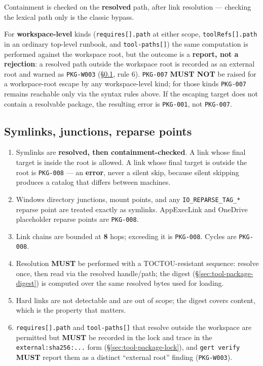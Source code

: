 Containment is checked on the \textbf{resolved} path, after link
resolution --- checking the lexical path only is the classic bypass.

For \textbf{workspace-level} kinds (\texttt{requires[].path} at either
scope, \texttt{toolRefs[].path} in an ordinary top-level runbook, and
\texttt{tool-paths[]}) the same computation is performed against the
workspace root, but the outcome is a \textbf{report, not a rejection}: a
resolved path outside the workspace root is recorded as an external root
and warned as \texttt{PKG-W003} (\S\ref{sec:tool-path-symlinks}, rule 6).
\texttt{PKG-007} \textbf{MUST NOT} be raised for a workspace-root escape by
any workspace-level kind; for those kinds \texttt{PKG-007} remains reachable
only via the syntax rules above. If the escaping target does not contain a
resolvable package, the resulting error is \texttt{PKG-001}, not
\texttt{PKG-007}.

\subsection{Symlinks, junctions, reparse points}
\label{sec:tool-path-symlinks}

\begin{enumerate}
  \item Symlinks are \textbf{resolved, then containment-checked}. A link
        whose final target is inside the root is allowed. A link whose
        final target is outside the root is \texttt{PKG-008} --- an
        \textbf{error}, never a silent skip, because silent skipping
        produces a catalog that differs between machines.
  \item Windows directory junctions, mount points, and any
        \texttt{IO\_REPARSE\_TAG\_*} reparse point are treated exactly as
        symlinks. AppExecLink and OneDrive placeholder reparse points are
        \texttt{PKG-008}.
  \item Link chains are bounded at \textbf{8} hops; exceeding it is
        \texttt{PKG-008}. Cycles are \texttt{PKG-008}.
  \item Resolution \textbf{MUST} be performed with a TOCTOU-resistant
        sequence: resolve once, then read via the resolved handle/path; the
        digest (\S\ref{sec:tool-package-digest}) is computed over the same
        resolved bytes used for loading.
  \item Hard links are not detectable and are out of scope; the digest
        covers content, which is the property that matters.
  \item \texttt{requires[].path} and \texttt{tool-paths[]} that resolve
        outside the workspace are permitted but \textbf{MUST} be recorded in
        the lock and trace in the \texttt{external:sha256:...} form
        (\S\ref{sec:tool-package-lock}), and \texttt{gert verify}
        \textbf{MUST} report them as a distinct ``external root'' finding
        (\texttt{PKG-W003}).
\end{enumerate}


